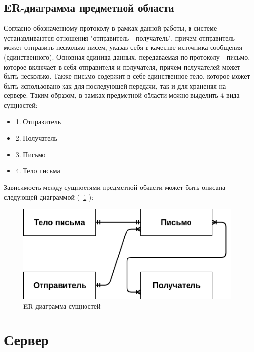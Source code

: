 \documentclass[a4paper,12pt]{report}
\begin{document}
\subsection{ER-диаграмма предметной области}
Согласно обозначенному протоколу в рамках данной работы, в системе устанавливаются отношения "отправитель - получатель", причем отправитель может отправить несколько писем, указав себя в качестве источника сообщения (единственного). Основная единица данных, передаваемая по протоколу - письмо, которое включает в себя отправителя и получателя, причем получателей может быть несколько. Также письмо содержит в себе единственное тело, которое может быть использовано как для последующей передачи, так и для хранения на сервере.
Таким образом, в рамках предметной области можно выделить 4 вида сущностей:
\begin{itemize}
    \item 1. Отправитель
    \item 2. Получатель
    \item 3. Письмо
    \item 4. Тело письма
\end{itemize}
Зависимость между сущностями предметной области может быть описана следующей диаграммой (~\ref{fig:er_diagram} ):
\begin{figure}
\centering
\includegraphics[width=\textwidth]{static/ER_diagram_field.png}
\caption{ER-диаграмма сущностей}
\label{fig:er_diagram}
\end{figure}

\section{Сервер}
\end{document}
